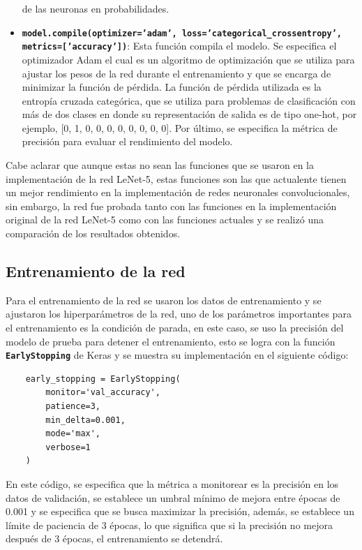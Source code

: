 \begin{itemize}
    de las neuronas en probabilidades.
    \item \textbf{\texttt{model.compile(optimizer='adam', loss='categorical\_crossentropy', metrics=['accuracy'])}}:
    Esta función compila el modelo. Se especifica el optimizador Adam el cual es un algoritmo de optimización que se utiliza
    para ajustar los pesos de la red durante el entrenamiento y que se encarga de minimizar la función de pérdida. 
    La función de pérdida utilizada es la entropía cruzada categórica, que se utiliza para problemas de clasificación 
    con más de dos clases en donde su representación de salida es de tipo one-hot, por ejemplo, [0, 1, 0, 0, 0, 0, 0, 0, 0, 0].
    Por último, se especifica la métrica de precisión para evaluar el rendimiento del modelo.
\end{itemize}

Cabe aclarar que aunque estas no sean las funciones que se usaron en la implementación de la red LeNet-5, estas funciones son las
que actualente tienen un mejor rendimiento en la implementación de redes neuronales convolucionales, sin embargo, la red fue 
probada tanto con las funciones en la implementación original de la red LeNet-5 como con las funciones actuales y se realizó una
comparación de los resultados obtenidos.

\subsection{Entrenamiento de la red}

Para el entrenamiento de la red se usaron los datos de entrenamiento y se ajustaron los hiperparámetros de la red, 
uno de los parámetros importantes para el entrenamiento es la condición de parada, en este caso, se uso la precisión
del modelo de prueba para detener el entrenamiento, esto se logra con la función \textbf{\texttt{EarlyStopping}} de Keras 
y se muestra su implementación en el siguiente código:

\begin{lstlisting}
    early_stopping = EarlyStopping(
        monitor='val_accuracy',   
        patience=3,               
        min_delta=0.001,          
        mode='max',               
        verbose=1                
    )
\end{lstlisting}

En este código, se especifica que la métrica a monitorear es la precisión en los datos de validación,
se establece un umbral mínimo de mejora entre épocas de 0.001 y se especifica que se busca maximizar la precisión,
además, se establece un límite de paciencia de 3 épocas, lo que significa que si la precisión no mejora después de 3 épocas,
el entrenamiento se detendrá.

